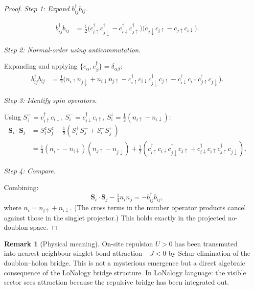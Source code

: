 \documentclass[12pt]{article}
\theoremstyle{plain}
\theoremstyle{definition}
\newtheorem{remark}[theorem]{Remark}
\numberwithin{equation}{section}
\begin{document}
\begin{proof}
\emph{Step 1: Expand $b_{ij}^\dagger b_{ij}$.}

\begin{align}
b_{ij}^\dagger b_{ij}
&= \tfrac{1}{2}\bigl(
c_{i\uparrow}^\dagger c_{j\downarrow}^\dagger
-c_{i\downarrow}^\dagger c_{j\uparrow}^\dagger
\bigr)
\bigl(
c_{j\downarrow}c_{i\uparrow}
-c_{j\uparrow}c_{i\downarrow}
\bigr).
\end{align}

\emph{Step 2: Normal-order using anticommutation.}

Expanding and applying $\{c_\alpha,c_\beta^\dagger\}=\delta_{\alpha\beta}$:
\begin{align}
b_{ij}^\dagger b_{ij}
&= \tfrac{1}{2}\bigl(
n_{i\uparrow}n_{j\downarrow}
+ n_{i\downarrow}n_{j\uparrow}
- c_{i\uparrow}^\dagger c_{i\downarrow}
c_{j\downarrow}^\dagger c_{j\uparrow}
- c_{i\downarrow}^\dagger c_{i\uparrow}
c_{j\uparrow}^\dagger c_{j\downarrow}
\bigr).
\end{align}

\emph{Step 3: Identify spin operators.}

Using $S_i^+ = c_{i\uparrow}^\dagger c_{i\downarrow}$,
$S_i^- = c_{i\downarrow}^\dagger c_{i\uparrow}$,
$S_i^z = \frac{1}{2}(n_{i\uparrow}-n_{i\downarrow})$:
\begin{align}
\bm{S}_i\cdot\bm{S}_j
&= S_i^z S_j^z + \tfrac{1}{2}(S_i^+S_j^- + S_i^-S_j^+)\\
&= \tfrac{1}{4}(n_{i\uparrow}-n_{i\downarrow})
(n_{j\uparrow}-n_{j\downarrow})
+ \tfrac{1}{2}(c_{i\uparrow}^\dagger c_{i\downarrow}
c_{j\downarrow}^\dagger c_{j\uparrow}
+ c_{i\downarrow}^\dagger c_{i\uparrow}
c_{j\uparrow}^\dagger c_{j\downarrow}).
\end{align}

\emph{Step 4: Compare.}

Combining:
\begin{equation}
\bm{S}_i\cdot\bm{S}_j - \tfrac{1}{4}n_in_j
= -b_{ij}^\dagger b_{ij},
\end{equation}
where $n_i=n_{i\uparrow}+n_{i\downarrow}$.  (The cross terms in
the number operator products cancel against those in the singlet
projector.)  This holds exactly in the projected no-doublon space.
\end{proof}

\begin{remark}[Physical meaning]
On-site repulsion $U>0$ has been transmuted into nearest-neighbour
singlet bond attraction $-J<0$ by Schur elimination of the
doublon--holon bridge.  This is not a mysterious emergence but a
direct algebraic consequence of the LoNalogy bridge structure.
In LoNalogy language: the visible sector sees attraction because
the repulsive bridge has been integrated out.
\end{remark}
\end{document}
